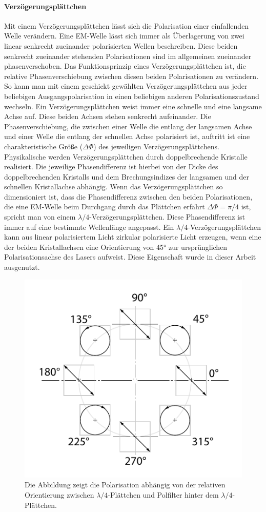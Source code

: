 \documentclass[titlepage]{article}
\begin{document}
	\paragraph{Verzögerungsplättchen}
		Mit einem Verzögerungsplättchen lässt sich die Polarisation einer einfallenden Welle verändern. Eine EM-Welle lässt sich immer als Überlagerung von zwei linear senkrecht zueinander polarisierten Wellen beschreiben. Diese beiden senkrecht zueinander stehenden Polarisationen sind im allgemeinen zueinander phasenverschoben. Das Funktionsprinzip eines Verzögerungsplättchen ist, die relative Phasenverschiebung zwischen diesen beiden Polarisationen zu verändern. So kann man mit einem geschickt gewählten Verzögerungsplättchen aus jeder beliebigen Ausgangspolarisation in einen beliebigen anderen Polarisationszustand wechseln. Ein Verzögerungsplättchen weist immer eine schnelle und eine langsame Achse auf. Diese beiden Achsen stehen senkrecht aufeinander. Die Phasenverschiebung, die zwischen einer Welle die entlang der langsamen Achse und einer Welle die entlang der schnellen Achse polarisiert ist, auftritt ist eine charakteristische Größe ($\Delta\Phi$) des jeweiligen Verzögerungsplättchens. Physikalische werden Verzögerungsplättchen durch doppelbrechende Kristalle realisiert. Die jeweilige Phasendifferenz ist hierbei von der Dicke des doppelbrechenden Kristalls und dem Brechungsindizes der langsamen und der schnellen Kristallachse abhängig. Wenn das Verzögerungsplättchen so dimensioniert ist, dass die Phasendifferenz zwischen den beiden Polarisationen, die eine EM-Welle beim Durchgang durch das Plättchen erfährt $\Delta \Phi = \pi /4 $ ist, spricht man von einem  $\lambda /4$-Verzögerungsplättchen. Diese Phasendifferenz ist immer auf eine bestimmte Wellenlänge angepasst.  Ein $\lambda /4$-Verzögerungsplättchen kann aus linear polarisiertem Licht zirkular polarisierte Licht erzeugen, wenn eine der beiden Kristallachsen eine Orientierung von 45° zur ursprünglichen Polarisationsachse des Lasers aufweist. Diese Eigenschaft wurde in dieser Arbeit ausgenutzt.
		\begin{figure}
			\centering
			\includegraphics[width=0.5\linewidth]{figures/Polarisation_lambda}
			\caption{Die Abbildung zeigt die Polarisation abhängig von der relativen Orientierung zwischen $\lambda/4$-Plättchen und Polfilter hinter dem $\lambda/4$-Plättchen.}
			\label{fig:polarisationlambda}
		\end{figure}
		
\end{document}
